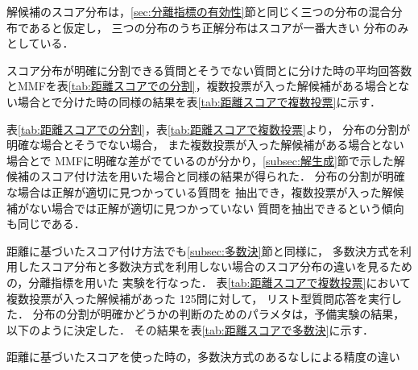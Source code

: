 \documentclass[japanese]{jnlp_1.4}
\begin{document}
解候補のスコア分布は，\ref{sec:分離指標の有効性}節と同じく三つの分布の混合分布であると仮定し，
三つの分布のうち正解分布はスコアが一番大きい
分布のみとしている．

スコア分布が明確に分割できる質問とそうでない質問とに分けた時の平均回答数とMMFを表\ref{tab:距離スコアでの分割}，複数投票が入った解候補がある場合とない場合とで分けた時の同様の結果を表\ref{tab:距離スコアで複数投票}に示す．

\begin{table}[b]
\vspace{-1\baselineskip}
\label{tab:距離スコアでの分割}
\begin{center}

\end{center}
\end{table}
\begin{table}[b]
\label{tab:距離スコアで複数投票}
\begin{center}

\end{center}
\end{table}

表\ref{tab:距離スコアでの分割}，表\ref{tab:距離スコアで複数投票}より，
分布の分割が明確な場合とそうでない場合，
また複数投票が入った解候補がある場合とない場合とで
MMFに明確な差がでているのが分かり，\ref{subsec:解生成}節で示した解候補のスコア付け法を用いた場合と同様の結果が得られた．
分布の分割が明確な場合は正解が適切に見つかっている質問を
抽出でき，複数投票が入った解候補がない場合では正解が適切に見つかっていない
質問を抽出できるという傾向も同じである．

距離に基づいたスコア付け方法でも\ref{subsec:多数決}節と同様に，
多数決方式を利用したスコア分布と多数決方式を利用しない場合のスコア分布の違いを見るための，分離指標を用いた
実験を行なった．
表\ref{tab:距離スコアで複数投票}において複数投票が入った解候補があった
125問に対して，
リスト型質問応答を実行した．
分布の分割が明確かどうかの判断のためのパラメタは，予備実験の結果，以下のように決定した．
その結果を表\ref{tab:距離スコアで多数決}に示す．

\begin{table}[b]
\caption{距離に基づいたスコアを使った時の，多数決方式のあるなしによる精度の違い}
\label{tab:距離スコアで多数決}
\vspace{-0.5\baselineskip}

\end{table}
\end{document}

